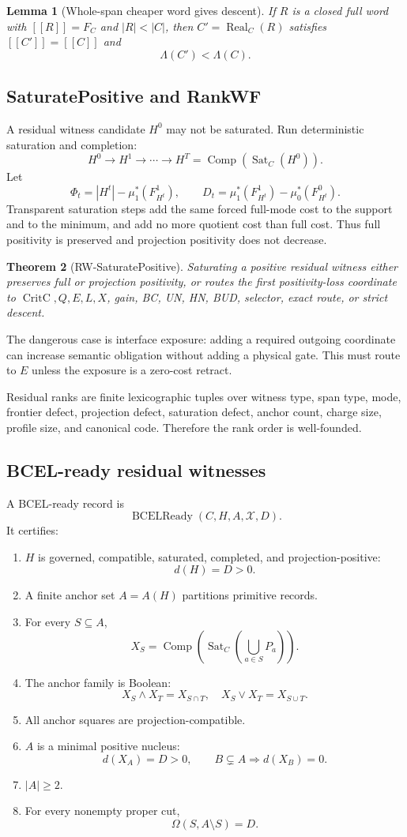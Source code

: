 \documentclass[10.5pt,a4paper]{article}
\newtheorem{theorem}{Theorem}[section]
\newtheorem{lemma}[theorem]{Lemma}
\newcommand{\Sat}{\operatorname{Sat}}
\newcommand{\Comp}{\operatorname{Comp}}
\newcommand{\Real}{\operatorname{Real}}
\newcommand{\CritC}{\operatorname{CritC}}
\begin{document}
\begin{lemma}[Whole-span cheaper word gives descent]
If \(R\) is a closed full word with \([[R]]=F_C\) and \(|R|<|C|\), then \(C'=\Real_C(R)\) satisfies \([[C']]=[[C]]\) and
\[
\Lambda(C')<\Lambda(C).
\]
\end{lemma}

\subsection{SaturatePositive and RankWF}
A residual witness candidate \(H^0\) may not be saturated. Run deterministic saturation and completion:
\[
H^0\to H^1\to\cdots\to H^T=\Comp(\Sat_C(H^0)).
\]
Let
\[
\Phi_t=|H^t|-\mu_1^*(F_{H^t}^1),\qquad D_t=\mu_1^*(F_{H^t}^1)-\mu_0^*(F_{H^t}^0).
\]
Transparent saturation steps add the same forced full-mode cost to the support and to the minimum, and add no more quotient cost than full cost. Thus full positivity is preserved and projection positivity does not decrease.

\begin{theorem}[RW-SaturatePositive]
Saturating a positive residual witness either preserves full or projection positivity, or routes the first positivity-loss coordinate to \(\CritC,Q,E,L,X\), gain, BC, UN, HN, BUD, selector, exact route, or strict descent.
\end{theorem}

The dangerous case is interface exposure: adding a required outgoing coordinate can increase semantic obligation without adding a physical gate. This must route to \(E\) unless the exposure is a zero-cost retract.

Residual ranks are finite lexicographic tuples over witness type, span type, mode, frontier defect, projection defect, saturation defect, anchor count, charge size, profile size, and canonical code. Therefore the rank order is well-founded.

\subsection{BCEL-ready residual witnesses}
A BCEL-ready record is
\[
\operatorname{BCELReady}(C,H,A,\mathcal X,D).
\]
It certifies:
\begin{enumerate}
\item \(H\) is governed, compatible, saturated, completed, and projection-positive:
\[
d(H)=D>0.
\]
\item A finite anchor set \(A=A(H)\) partitions primitive records.
\item For every \(S\subseteq A\),
\[
X_S=\Comp(\Sat_C(\bigcup_{a\in S}P_a)).
\]
\item The anchor family is Boolean:
\[
X_S\wedge X_T=X_{S\cap T},\quad X_S\vee X_T=X_{S\cup T}.
\]
\item All anchor squares are projection-compatible.
\item \(A\) is a minimal positive nucleus:
\[
d(X_A)=D>0,
\qquad B\subsetneq A\Rightarrow d(X_B)=0.
\]
\item \(|A|\ge2\).
\item For every nonempty proper cut,
\[
\Omega(S,A\setminus S)=D.
\]
\end{enumerate}
\end{document}
